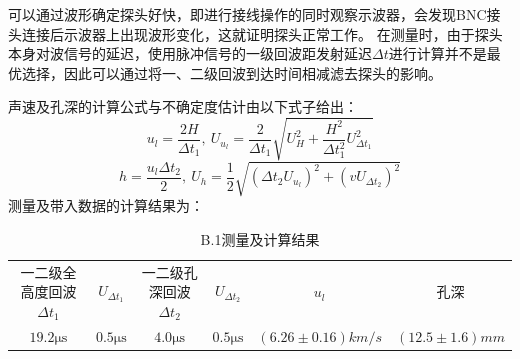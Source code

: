 \documentclass[UTF8,a4paper]{article}%
\begin{document}
可以通过波形确定探头好快，即进行接线操作的同时观察示波器，会发现BNC接头连接后示波器上出现波形变化，这就证明探头正常工作。
在测量时，由于探头本身对波信号的延迟，使用脉冲信号的一级回波距发射延迟$\Delta t$进行计算并不是最优选择，因此可以通过将一、二级回波到达时间相减滤去探头的影响。

声速及孔深的计算公式与不确定度估计由以下式子给出：
$$u_l=\frac{2H}{\Delta t_1},~U_{u_l}=\frac{2}{\Delta t_1}\sqrt{U_H^2+\frac{H^2}{\Delta t_1^2}U_{\Delta t_1}^2}$$
$$h=\frac{u_l\Delta t_2}{2},~U_h=\frac{1}{2}\sqrt{(\Delta t_2 U_{u_l})^2+(vU_{\Delta t_2})^2}$$
测量及带入数据的计算结果为：
\begin{table}[H]
    \centering
    \caption{B.1测量及计算结果}
    \label{tab:b1}
    \begin{tabular}{cccccc}
        \hline
        一二级全高度回波$\Delta t_1$       & $U_{\Delta t_1}$          & 一二级孔深回波$\Delta t_2$       & $U_{\Delta t_2}$          & $u_l$                        & 孔深                        \\
        $19.2\unit{\micro\second}$ & $0.5\unit{\micro\second}$ & $4.0\unit{\micro\second}$ & $0.5\unit{\micro\second}$ & $(6.26 \pm 0.16)\unit{km/s}$ & $(12.5 \pm 1.6)\unit{mm}$ \\ \hline
    \end{tabular}
\end{table}
\end{document}
